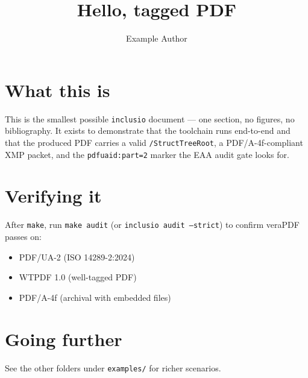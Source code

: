 \documentclass[final,tagged]{pub-base}
\title{Hello, tagged PDF}
\author{Example Author}
\begin{document}
\maketitle

\section{What this is}

This is the smallest possible \texttt{inclusio} document — one section,
no figures, no bibliography. It exists to demonstrate that the
toolchain runs end-to-end and that the produced PDF carries a valid
\texttt{/StructTreeRoot}, a PDF/A-4f-compliant XMP packet, and the
\texttt{pdfuaid:part=2} marker the EAA audit gate looks for.

\section{Verifying it}

After \texttt{make}, run \texttt{make audit} (or
\texttt{inclusio audit --strict}) to confirm veraPDF passes on:

\begin{itemize}
  \item PDF/UA-2 (ISO 14289-2:2024)
  \item WTPDF 1.0 (well-tagged PDF)
  \item PDF/A-4f (archival with embedded files)
\end{itemize}

\section{Going further}

See the other folders under \texttt{examples/} for richer scenarios.
\end{document}
